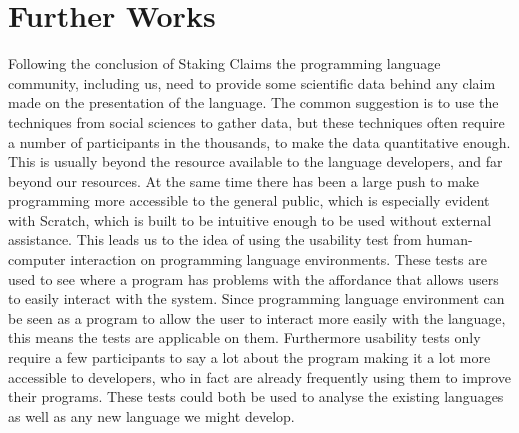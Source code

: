 \chapter{Further Works}
\label{chap:further_works}
Following the conclusion of Staking Claims the programming language community, including us, need to provide some scientific data behind any claim made on the presentation of the language.
The common suggestion is to use the techniques from social sciences to gather data, but these techniques often require a number of participants in the thousands, to make the data quantitative enough.
This is usually beyond the resource available to the language developers, and far beyond our resources.
At the same time there has been a large push to make programming more accessible to the general public, which is especially evident with Scratch, which is built to be intuitive enough to be used without external assistance.
This leads us to the idea of using the usability test from human-computer interaction on programming language environments.
These tests are used to see where a program has problems with the affordance that allows users to easily interact with the system.
Since programming language environment can be seen as a program to allow the user to interact more easily with the language, this means the tests are applicable on them.
Furthermore usability tests only require a few participants to say a lot about the program making it a lot more accessible to developers, who in fact are already frequently using them to improve their programs.
These tests could both be used to analyse the existing languages as well as any new language we might develop.

